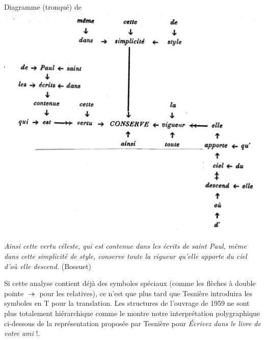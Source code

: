 {    \ea
    Diagramme (tronqué) de \citet{Tesnière1934}
    \includegraphics[width=\textwidth]{figures/vol1syntaxe2-img017.png}

    \textit{Ainsi cette vertu céleste, qui est contenue dans les écrits de saint Paul, même dans cette simplicité de style, conserve toute la vigueur qu’elle apporte du ciel d’où elle descend.} (Bossuet)
    \z

    Si cette analyse contient déjà des symboles spéciaux (comme les flèches à double pointe \textrm{$\twoheadrightarrow $} pour les relatives), ce n’est que plus tard que Tesnière introduira les symboles en T pour la translation. Les structures de l’ouvrage de 1959 ne sont plus totalement hiérarchique comme le montre notre interprétation polygraphique ci-dessous de la représentation proposée par Tesnière pour \textit{Écrivez dans le livre de votre ami} !.

}
